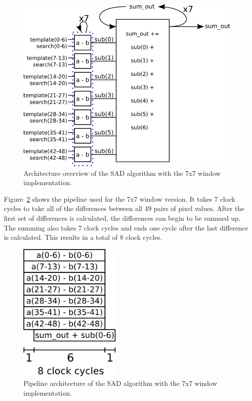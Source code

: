 \begin{figure}[h]
	\begin{center}
		\includegraphics[width=130mm]{figures/sadAlgorithm7x7.png}
		\captionfonts
		\caption{Architecture overview of the SAD algorithm with the 7x7 window implementation.}
		\label{fig:sadAlg7x7}
	\end{center}
\end{figure}

Figure~\ref{fig:sadPipe7x7} shows the pipeline used for the 7x7 window version. It takes 7 clock cycles to take all of the differences between all 49 pairs of pixel values. After the first set of differences is calculated, the differences can begin to be summed up. The summing also takes 7 clock cycles and ends one cycle after the last difference is calculated. This results in a total of 8 clock cycles.

\begin{figure}[h]
	\begin{center}
		\includegraphics[width=50mm]{figures/sadPipeline7x7.png}
		\captionfonts
		\caption{Pipeline architecture of the SAD algorithm with the 7x7 window implementation.}
		\label{fig:sadPipe7x7}
	\end{center}
\end{figure}


